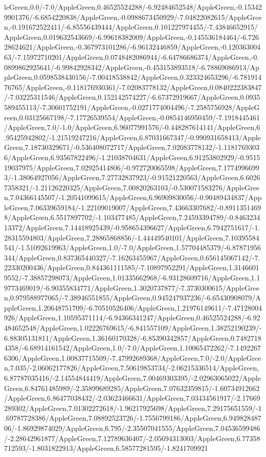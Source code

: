 {\begin{tikzternal}
leGreen,0.0/-7.0/AppleGreen,0.46525524288/-6.92484652548/AppleGreen,-0.153429901376/-6.6854220838/AppleGreen,-0.0988673450929/-7.04822082615/AppleGreen,-0.191672522411/-6.85556439444/AppleGreen,0.101227974455/-7.43846652915/AppleGreen,0.019632543669/-6.99618382009/AppleGreen,-0.145536184464/-6.72628624621/AppleGreen,-0.367973101286/-6.96132446859/AppleGreen,-0.12036300463/-7.15972710201/AppleGreen,0.0748482086944/-6.64786686374/AppleGreen,-0.0899862925641/-6.99842928342/AppleGreen,-0.453153893518/-6.78869086913/AppleGreen,0.0598538430156/-7.00418538842/AppleGreen,0.323324653296/-6.78191476765/AppleGreen,-0.118176930361/-7.02083778132/AppleGreen,0.0840222383847/-7.03225311546/AppleGreen,0.152142574227/-6.67372919667/AppleGreen,0.0935589455113/-7.30601752191/AppleGreen,-0.0271774004496/-7.2585756928/AppleGreen,0.03125667198/-7.17726539554/AppleGreen,-0.0854146950459/-7.1918445461/AppleGreen,7.0/-1.0/AppleGreen,6.96077991576/-0.448287614141/AppleGreen,6.95425942802/-1.21519247216/AppleGreen,6.87031667347/-0.990931658413/AppleGreen,7.18730329671/-0.536408072717/AppleGreen,7.02083778132/-1.11817693036/AppleGreen,6.93567822496/-1.21038704631/AppleGreen,6.91253802929/-0.951519037975/AppleGreen,7.02925414806/-0.972720065598/AppleGreen,7.17749966993/-1.38064927056/AppleGreen,7.27732837923/-0.91521220563/AppleGreen,6.60267358321/-1.21126220325/AppleGreen,7.00820263103/-0.530071583276/AppleGreen,7.04366145507/-1.20541099615/AppleGreen,6.96909830056/-0.90489434837/AppleGreen,7.06339659184/-1.22109019007/AppleGreen,7.43663307682/-0.89113514698/AppleGreen,6.5517897702/-1.103477485/AppleGreen,7.24593394789/-0.846323413372/AppleGreen,7.14418925439/-0.958654396627/AppleGreen,6.7942751617/-1.28315594803/AppleGreen,7.28865868856/-1.44449540101/AppleGreen,7.10395584541/-1.51092619963/AppleGreen,1.0/-7.0/AppleGreen,1.57704485379/-6.87871956344/AppleGreen,0.837365440327/-7.16263455967/AppleGreen,0.656145067142/-7.22330200436/AppleGreen,0.844361111585/-7.10897952291/AppleGreen,1.31466019552/-7.38857298073/AppleGreen,1.01335662968/-6.93128609716/AppleGreen,1.19773469019/-6.90355834771/AppleGreen,1.3020737877/-7.3730300615/AppleGreen,0.979588977065/-7.38946551855/AppleGreen,0.945247937236/-6.65430908079/AppleGreen,1.20648751709/-6.70510526406/AppleGreen,1.21976149611/-7.47128004926/AppleGreen,1.10595371114/-6.94366341247/AppleGreen,0.46525524288/-6.92484652548/AppleGreen,1.02226769615/-6.841557109/AppleGreen,1.38252190239/-6.88305131811/AppleGreen,1.36160170328/-6.85390342857/AppleGreen,0.74827184358/-6.68914161542/AppleGreen,1.0/-7.0/AppleGreen,1.10065472262/-7.14922676306/AppleGreen,1.00837715509/-7.47992689368/AppleGreen,7.0/-2.0/AppleGreen,7.035/-2.06062177826/AppleGreen,7.50619853734/-2.06215336514/AppleGreen,6.87787035416/-2.14554844419/AppleGreen,7.00469303395/-2.02963065022/AppleGreen,6.84761485989/-2.35899689285/AppleGreen,7.07632359815/-1.60734912662/AppleGreen,6.86477038432/-2.03623466631/AppleGreen,7.03434561917/-2.17669289302/AppleGreen,7.01302272618/-1.96217925698/AppleGreen,7.29175651559/-1.69787728386/AppleGreen,7.08892523726/-1.7556799186/AppleGreen,6.94982848706/-1.86929874029/AppleGreen,6.795/-2.35507041555/AppleGreen,7.04536599486/-2.28642961877/AppleGreen,7.12789636407/-2.05694313003/AppleGreen,6.77358712593/-1.8031822913/AppleGreen,6.58577281595/-1.8241709921
\end{tikzternal}}
